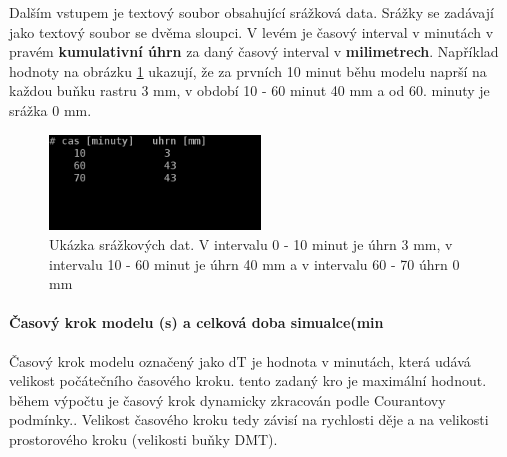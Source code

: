 Dalším vstupem je textový soubor obsahující srážková data. 
% 
% 
% 
Srážky se zadávají jako textový soubor se dvěma sloupci. V levém je časový interval v minutách v pravém \textbf{kumulativní úhrn} za daný časový interval v \textbf{milimetrech}. Například hodnoty na obrázku \ref{fig:srazkovysoubor} ukazují, že za prvních 10 minut běhu modelu naprší  na každou buňku rastru 3 mm, v období 10 - 60 minut 40 mm a od 60. minuty je srážka 0 mm. 
\begin{figure}
  \centering
  \includegraphics[width=0.5\textwidth]{./img/srazka.png}
  \caption{Ukázka srážkových dat. V intervalu 0 - 10 minut je úhrn 3 mm, v intervalu 10 - 60 minut je úhrn 40 mm a v intervalu 60 - 70 úhrn 0 mm}
  \label{fig:srazkovysoubor}
\end{figure}


\paragraph{Časový krok modelu (s) a celková doba simualce(min} \label{sec:vstupkrok}

Časový krok modelu označený jako \acs{dT} je hodnota v minutách, která udává velikost počátečního časového kroku. tento zadaný kro je maximální hodnout. během výpočtu je časový krok dynamicky zkracován podle Courantovy podmínky.. Velikost časového kroku tedy závisí na rychlosti děje a na velikosti prostorového kroku (velikosti buňky DMT). %


